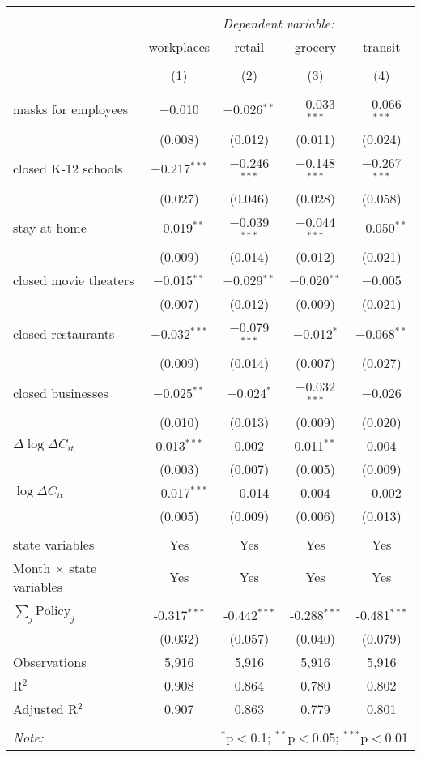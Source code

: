 \begin{tabular}{@{\extracolsep{1pt}}lcccc} 
\\[-1.8ex]\hline 
\hline \\[-1.8ex] 
 & \multicolumn{4}{c}{\textit{Dependent variable:}} \\ 
\cline{2-5} 
 & workplaces & retail & grocery & transit \\ 
\\[-1.8ex] & (1) & (2) & (3) & (4)\\ 
\hline \\[-1.8ex] 
 masks for employees & $-$0.010 & $-$0.026$^{**}$ & $-$0.033$^{***}$ & $-$0.066$^{***}$ \\ 
  & (0.008) & (0.012) & (0.011) & (0.024) \\ 
  closed K-12 schools & $-$0.217$^{***}$ & $-$0.246$^{***}$ & $-$0.148$^{***}$ & $-$0.267$^{***}$ \\ 
  & (0.027) & (0.046) & (0.028) & (0.058) \\ 
  stay at home & $-$0.019$^{**}$ & $-$0.039$^{***}$ & $-$0.044$^{***}$ & $-$0.050$^{**}$ \\ 
  & (0.009) & (0.014) & (0.012) & (0.021) \\ 
  closed movie theaters & $-$0.015$^{**}$ & $-$0.029$^{**}$ & $-$0.020$^{**}$ & $-$0.005 \\ 
  & (0.007) & (0.012) & (0.009) & (0.021) \\ 
  closed restaurants & $-$0.032$^{***}$ & $-$0.079$^{***}$ & $-$0.012$^{*}$ & $-$0.068$^{**}$ \\ 
  & (0.009) & (0.014) & (0.007) & (0.027) \\ 
  closed businesses & $-$0.025$^{**}$ & $-$0.024$^{*}$ & $-$0.032$^{***}$ & $-$0.026 \\ 
  & (0.010) & (0.013) & (0.009) & (0.020) \\ 
  $\Delta \log \Delta C_{it}$ & 0.013$^{***}$ & 0.002 & 0.011$^{**}$ & 0.004 \\ 
  & (0.003) & (0.007) & (0.005) & (0.009) \\ 
  $\log \Delta C_{it}$ & $-$0.017$^{***}$ & $-$0.014 & 0.004 & $-$0.002 \\ 
  & (0.005) & (0.009) & (0.006) & (0.013) \\ 
 \hline \\[-1.8ex] 
state variables & Yes & Yes & Yes & Yes \\ 
Month $\times$ state variables & Yes & Yes & Yes & Yes \\ 
\hline \\[-1.8ex] 
$\sum_j \mathrm{Policy}_j$ & -0.317$^{***}$ & -0.442$^{***}$ & -0.288$^{***}$ & -0.481$^{***}$ \\ 
 & (0.032) & (0.057) & (0.040) & (0.079) \\ 
Observations & 5,916 & 5,916 & 5,916 & 5,916 \\ 
R$^{2}$ & 0.908 & 0.864 & 0.780 & 0.802 \\ 
Adjusted R$^{2}$ & 0.907 & 0.863 & 0.779 & 0.801 \\ 
\hline 
\hline \\[-1.8ex] 
\textit{Note:}  & \multicolumn{4}{r}{$^{*}$p$<$0.1; $^{**}$p$<$0.05; $^{***}$p$<$0.01} \\ 
\end{tabular} 